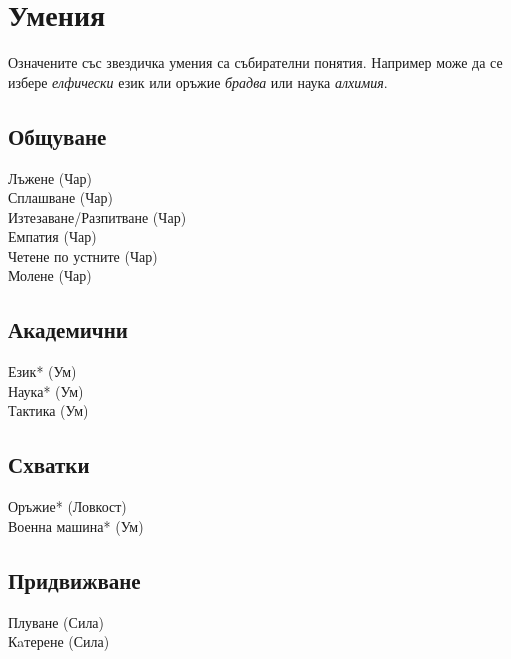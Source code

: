 \section{Умения}
Означените със звездичка умения са събирателни понятия.
Например може да се избере \textit{елфически} език или оръжие \textit{брадва} или наука \textit{алхимия}.
\subsection{Общуване}
Лъжене (Чар)                      \\
Сплашване (Чар)                   \\
Изтезаване/Разпитване (Чар)       \\
Емпатия (Чар)                     \\
Четене по устните (Чар)           \\
Молене (Чар)                      \\

\subsection{Академични}
Език* (Ум)                        \\
Наука* (Ум)                       \\
Тактика (Ум)                      \\

\subsection{Схватки}
Оръжие* (Ловкост)                 \\
Военна машина* (Ум)               \\

\subsection{Придвижване}
Плуване (Сила)                    \\
Кaтерене (Сила)                   \\

